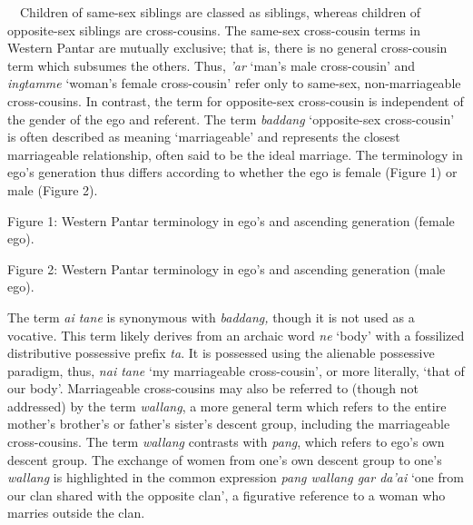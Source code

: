 \ \ Children of same-sex siblings are classed as siblings, whereas children of opposite-sex siblings are cross-cousins. The same-sex cross-cousin terms in Western Pantar are mutually exclusive; that is, there is no general cross-cousin term which subsumes the others. Thus, \textit{{\textquoteright}ar} {\textquoteleft}man{\textquoteright}s male cross-cousin{\textquoteright} and \textit{ingtamme} {\textquoteleft}woman{\textquoteright}s female cross-cousin{\textquoteright} refer only to same-sex, non-marriageable cross-cousins. In contrast, the term for opposite-sex cross-cousin is independent of the gender of the ego and referent. The term \textit{baddang} {\textquoteleft}opposite-sex cross-cousin{\textquoteright} is often described as meaning {\textquoteleft}marriageable{\textquoteright} and represents the closest marriageable relationship, often said to be the ideal marriage. The terminology in ego{\textquoteright}s generation thus differs according to whether the ego is female (Figure 1) or male (Figure 2).

{\centering
Figure 1: Western Pantar terminology in ego{\textquoteright}s and ascending generation (female ego). 
\par}

{%
 \par}

{\centering
Figure 2: Western Pantar terminology in ego{\textquoteright}s and ascending generation (male ego). 
\par}

{%
 \par}

The term \textit{ai tane }is synonymous with \textit{baddang, }though it is not used as a vocative\textit{. }This term likely derives from an archaic word \textit{ne} {\textquoteleft}body{\textquoteright} with a fossilized distributive possessive prefix \textit{ta}.\textit{ }It is possessed using the alienable possessive paradigm, thus, \textit{nai tane }{\textquoteleft}my marriageable cross-cousin{\textquoteright}, or more literally, {\textquoteleft}that of our body{\textquoteright}. Marriageable cross-cousins may also be referred to (though not addressed) by the term \textit{wallang}, a more general term which refers to the entire mother{\textquoteright}s brother{\textquoteright}s or father{\textquoteright}s sister{\textquoteright}s descent group, including the marriageable cross-cousins. The term \textit{wallang }contrasts with \textit{pang}, which refers to ego{\textquoteright}s own descent group. The exchange of women from one{\textquoteright}s own descent group to one{\textquoteright}s \textit{wallang} 
is highlighted in the common expression \textit{pang wallang gar da{\textquoteright}ai }{\textquoteleft}one from our clan shared with the opposite clan{\textquoteright}, a figurative reference to a woman who marries outside the clan. 

